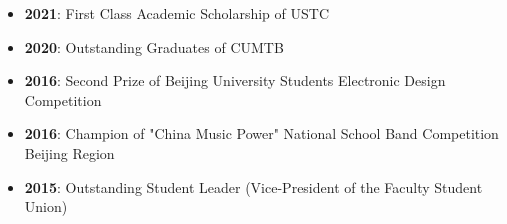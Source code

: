   \begin{itemize}[leftmargin=*]
    \item \textbf{2021}: First Class Academic Scholarship of USTC
    \item \textbf{2020}: Outstanding Graduates of CUMTB
    \item \textbf{2016}: Second Prize of Beijing University Students Electronic Design Competition
    \item \textbf{2016}: Champion of "China Music Power" National School Band Competition Beijing Region
    \item \textbf{2015}: Outstanding Student Leader (Vice-President of the Faculty Student Union)
  \end{itemize}
